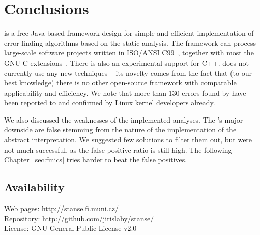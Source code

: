 
\section{Conclusions}\label{sec:stan_concl}

\stan is a free Java-based framework design for simple and efficient
implementation of error-finding algorithms based on the static analysis. The
framework can process large-scale software projects written in ISO/ANSI
C99~\cite{ansi_c}, together with most the GNU C extensions~\cite{gcc}. There
is also an experimental support for C++.
\stan
does not currently use any new techniques -- its novelty comes from the fact
that (to our best knowledge) there is no other open-source framework with
comparable applicability and efficiency. We note that more than 130 errors
found by \stan have been reported to and confirmed by Linux kernel developers
already.

We also discussed the weaknesses of the implemented analyses. The \stan's
major downside are false stemming from the nature of the implementation of the
abstract interpretation. We suggested few solutions to filter them out, but
were not much successful, as the false positive ratio is still high. The
following Chapter~\ref{sec:fmics} tries harder to beat the false positives.

\subsection*{Availability}
\noindent Web pages: \url{http://stanse.fi.muni.cz/} \\
\noindent Repository: \url{http://github.com/jirislaby/stanse/} \\
\noindent License: GNU General Public License v2.0


